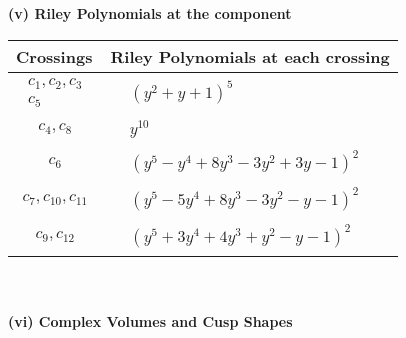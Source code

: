 \documentclass[1p]{elsarticle_modified}
\theoremstyle{definition}
\begin{document}
\newpage\renewcommand{\arraystretch}{1}
\flushleft \textbf{(v) Riley Polynomials at the component}\newline \\
\begin{tabular}{m{50pt}|m{274pt}}
Crossings & \hspace{64pt}Riley Polynomials at each crossing \\
\hline $$\begin{aligned}c_{1},c_{2},c_{3}\\c_{5}\end{aligned}$$&$\begin{aligned}
&(y^2+y+1)^5
\end{aligned}$\\
\hline $$\begin{aligned}c_{4},c_{8}\end{aligned}$$&$\begin{aligned}
&y^{10}
\end{aligned}$\\
\hline $$\begin{aligned}c_{6}\end{aligned}$$&$\begin{aligned}
&(y^5- y^4+8 y^3-3 y^2+3 y-1)^2
\end{aligned}$\\
\hline $$\begin{aligned}c_{7},c_{10},c_{11}\end{aligned}$$&$\begin{aligned}
&(y^5-5 y^4+8 y^3-3 y^2- y-1)^2
\end{aligned}$\\
\hline $$\begin{aligned}c_{9},c_{12}\end{aligned}$$&$\begin{aligned}
&(y^5+3 y^4+4 y^3+y^2- y-1)^2
\end{aligned}$\\
\hline
\end{tabular}\\~\\
\newpage\flushleft \textbf{(vi) Complex Volumes and Cusp Shapes}
\end{document}
